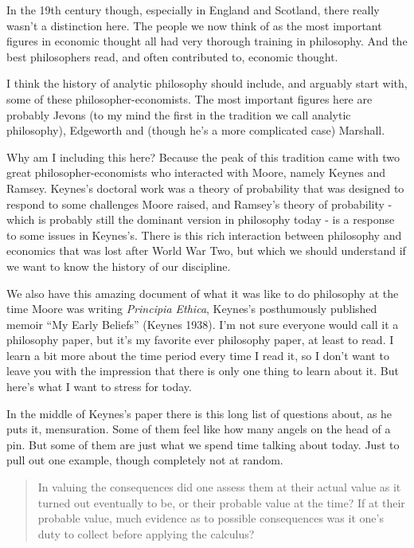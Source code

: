 \documentclass[
]{article}
\begin{document}
In the 19th century though, especially in England and Scotland, there
really wasn't a distinction here. The people we now think of as the most
important figures in economic thought all had very thorough training in
philosophy. And the best philosophers read, and often contributed to,
economic thought.

I think the history of analytic philosophy should include, and arguably
start with, some of these philosopher-economists. The most important
figures here are probably Jevons (to my mind the first in the tradition
we call analytic philosophy), Edgeworth and (though he's a more
complicated case) Marshall.

Why am I including this here? Because the peak of this tradition came
with two great philosopher-economists who interacted with Moore, namely
Keynes and Ramsey. Keynes's doctoral work was a theory of probability
that was designed to respond to some challenges Moore raised, and
Ramsey's theory of probability - which is probably still the dominant
version in philosophy today - is a response to some issues in Keynes's.
There is this rich interaction between philosophy and economics that was
lost after World War Two, but which we should understand if we want to
know the history of our discipline.

We also have this amazing document of what it was like to do philosophy
at the time Moore was writing \emph{Principia Ethica}, Keynes's
posthumously published memoir ``My Early Beliefs'' (Keynes 1938). I'm
not sure everyone would call it a philosophy paper, but it's my favorite
ever philosophy paper, at least to read. I learn a bit more about the
time period every time I read it, so I don't want to leave you with the
impression that there is only one thing to learn about it. But here's
what I want to stress for today.

In the middle of Keynes's paper there is this long list of questions
about, as he puts it, mensuration. Some of them feel like how many
angels on the head of a pin. But some of them are just what we spend
time talking about today. Just to pull out one example, though
completely not at random.

\begin{quote}
In valuing the consequences did one assess them at their actual value as
it turned out eventually to be, or their probable value at the time? If
at their probable value, much evidence as to possible consequences was
it one's duty to collect before applying the calculus?
\end{quote}
\end{document}
